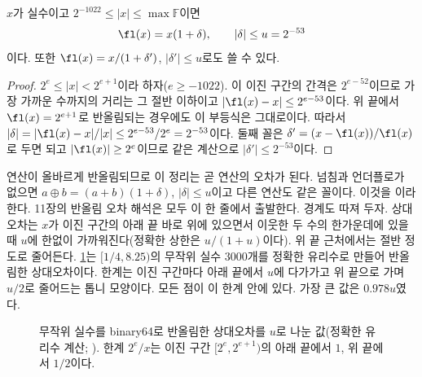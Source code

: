 \begin{theorem}
\label{thm:standard-model}
$x$가 실수이고 $2^{-1022}\le|x|\le\max\mathbb F$이면
\[
\fl(x)=x(1+\delta),\qquad|\delta|\le u=2^{-53}
\]
이다. 또한 $\fl(x)=x/(1+\delta')$, $|\delta'|\le u$로도 쓸 수 있다.
\end{theorem}

\begin{proof}
$2^e\le|x|<2^{e+1}$이라 하자($e\ge-1022$). 이 이진 구간의 간격은 $2^{e-52}$이므로 가장 가까운 수까지의 거리는 그 절반 이하이고 $|\fl(x)-x|\le2^{e-53}$이다. 위 끝에서 $\fl(x)=2^{e+1}$로 반올림되는 경우에도 이 부등식은 그대로이다. 따라서 $|\delta|=|\fl(x)-x|/|x|\le2^{e-53}/2^e=2^{-53}$이다. 둘째 꼴은 $\delta'=(x-\fl(x))/\fl(x)$로 두면 되고 $|\fl(x)|\ge2^e$이므로 같은 계산으로 $|\delta'|\le2^{-53}$이다.
\end{proof}

연산이 올바르게 반올림되므로 이 정리는 곧 연산의 오차가 된다. 넘침과 언더플로가 없으면 $a\oplus b=(a+b)(1+\delta)$, $|\delta|\le u$이고 다른 연산도 같은 꼴이다. 이것을 이라 한다. 11장의 반올림 오차 해석은 모두 이 한 줄에서 출발한다. 경계도 따져 두자. 상대오차는 $x$가 이진 구간의 아래 끝 바로 위에 있으면서 이웃한 두 수의 한가운데에 있을 때 $u$에 한없이 가까워진다(정확한 상한은 $u/(1+u)$이다). 위 끝 근처에서는 절반 정도로 줄어든다. \cref{fig:relerr}는 $[1/4,8.25)$의 무작위 실수 $3000$개를 정확한 유리수로 만들어 반올림한 상대오차이다. 한계는 이진 구간마다 아래 끝에서 $u$에 다가가고 위 끝으로 가며 $u/2$로 줄어드는 톱니 모양이다. 모든 점이 이 한계 안에 있다. 가장 큰 값은 $0.978u$였다.

\begin{figure}[htbp]
\centering
{}
\caption{무작위 실수를 binary64로 반올림한 상대오차를 $u$로 나눈 값(정확한 유리수 계산; ). 한계 $2^e/x$는 이진 구간 $[2^e,2^{e+1})$의 아래 끝에서 $1$, 위 끝에서 $1/2$이다.}
\label{fig:relerr}
\end{figure}

